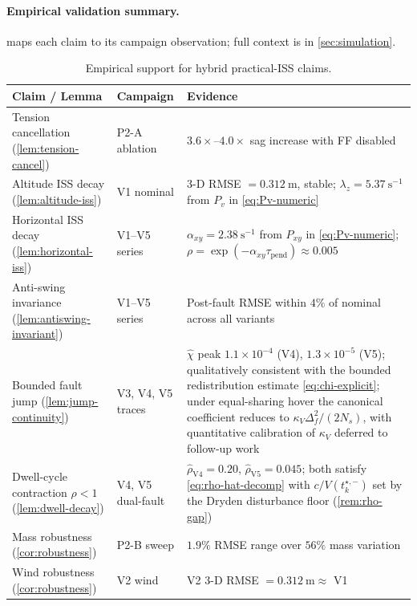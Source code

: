 \paragraph{Empirical validation summary.}
\label{sec:stability-empirical-validation}
 maps each claim to its campaign
observation; full context is in \cref{sec:simulation}.

\begin{table}[t]
  \centering
  \caption{Empirical support for hybrid practical-ISS claims.}
  \label{tab:stability-evidence}
  \small
  \renewcommand{\arraystretch}{1.05}
  \begin{tabular}{p{5.5cm}p{2.5cm}p{8cm}}
    \toprule
    Claim / Lemma & Campaign & Evidence \\
    \midrule
    Tension cancellation (\cref{lem:tension-cancel})
      & P2-A ablation
      & $3.6\times$--$4.0\times$ sag increase with FF
        disabled \\
    Altitude ISS decay (\cref{lem:altitude-iss})
      & V1 nominal
      & 3-D RMSE $= \SI{0.312}{\metre}$, stable;
        $\lambda_z = \SI{5.37}{\second^{-1}}$ from $P_v$
        in \eqref{eq:Pv-numeric} \\
    Horizontal ISS decay (\cref{lem:horizontal-iss})
      & V1--V5 series
      & $\alpha_{xy} = \SI{2.38}{\second^{-1}}$
        from $P_{xy}$ in \eqref{eq:Pv-numeric};
        $\rho = \exp(-\alpha_{xy}\tau_{\mathrm{pend}})
        \approx 0.005$ \\
    Anti-swing invariance (\cref{lem:antiswing-invariant})
      & V1--V5 series
      & Post-fault RMSE within $4\%$ of nominal
        across all variants \\
    Bounded fault jump (\cref{lem:jump-continuity})
      & V3, V4, V5 traces
      & $\hat\chi$ peak $1.1\!\times\!10^{-4}$ (V4),
        $1.3\!\times\!10^{-5}$ (V5); qualitatively consistent
        with the bounded redistribution estimate
        \eqref{eq:chi-explicit}; under equal-sharing hover
        the canonical coefficient reduces to
        $\kappa_V\Delta_f^2/(2N_s)$, with quantitative
        calibration of $\kappa_V$ deferred to follow-up work \\
    Dwell-cycle contraction $\rho < 1$
        (\cref{lem:dwell-decay})
      & V4, V5 dual-fault
      & $\hat\rho_{\mathrm{V4}} = 0.20$,
        $\hat\rho_{\mathrm{V5}} = 0.045$;
        both satisfy \eqref{eq:rho-hat-decomp}
        with $c/V(t_k^{\star,-})$ set by the Dryden
        disturbance floor (\cref{rem:rho-gap}) \\
    Mass robustness (\cref{cor:robustness})
      & P2-B sweep
      & $1.9\%$ RMSE range over $56\%$ mass variation \\
    Wind robustness (\cref{cor:robustness})
      & V2 wind
      & V2 3-D RMSE $= \SI{0.312}{\metre} \approx$ V1 \\
    \bottomrule
  \end{tabular}
\end{table}

